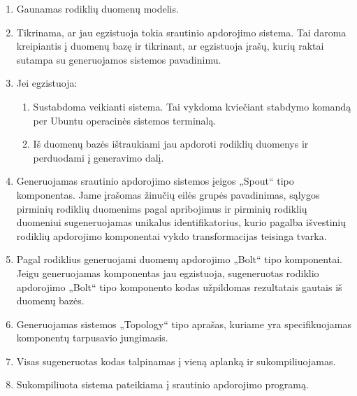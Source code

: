 \documentclass{VUMIFPSbakalaurinis}
\begin{document}
\begin{enumerate}
    \item Gaunamas rodiklių duomenų modelis.
    \item Tikrinama, ar jau egzistuoja tokia srautinio apdorojimo sistema. Tai daroma kreipiantis į duomenų bazę ir tikrinant, ar egzistuoja įrašų, kurių raktai sutampa su generuojamos sistemos pavadinimu.
    \item Jei egzistuoja:
        \begin{enumerate}
            \item Sustabdoma veikianti sistema. Tai vykdoma kviečiant stabdymo komandą per Ubuntu operacinės sistemos terminalą.
            \item Iš duomenų bazės ištraukiami jau apdoroti rodiklių duomenys ir perduodami į generavimo dalį.
        \end{enumerate} 
    \item Generuojamas srautinio apdorojimo sistemos įeigos „Spout“ tipo komponentas. Jame įrašomas žinučių eilės grupės pavadinimas, sąlygos pirminių rodiklių duomenims pagal apribojimus ir pirminių rodiklių duomeniui sugeneruojamas unikalus identifikatorius, kurio pagalba išvestinių rodiklių apdorojimo komponentai vykdo transformacijas teisinga tvarka.
    \item Pagal rodiklius generuojami duomenų apdorojimo „Bolt“ tipo komponentai. Jeigu generuojamas komponentas jau egzistuoja, sugeneruotas rodiklio apdorojimo „Bolt“ tipo komponento kodas užpildomas rezultatais gautais iš duomenų bazės. 
    \item Generuojamas sistemos „Topology“ tipo aprašas, kuriame yra specifikuojamas komponentų tarpusavio jungimasis. 
    \item Visas sugeneruotas kodas talpinamas į vieną aplanką ir sukompiliuojamas.
    \item Sukompiliuota sistema pateikiama į srautinio apdorojimo programą.
\end{enumerate}
\end{document}
